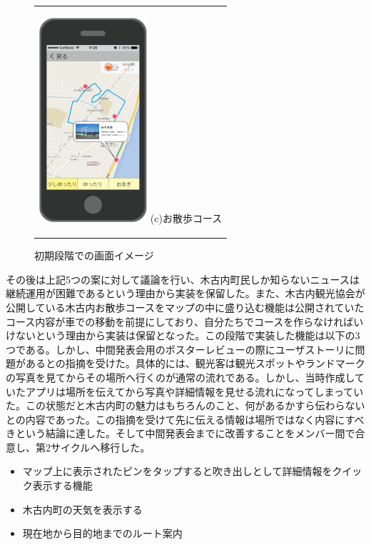 \begin{figure}[htbp]
\begin{center}
\begin{tabular}{c}
      \begin{minipage}{0.33\hsize}
        \begin{center}
\includegraphics[width=4cm, bb=0 0 302 572]{5.2_sanpo.png}
          \hspace{1cm} (c)お散歩コース
        \end{center}
      \end{minipage}

    \end{tabular}
    \caption{初期段階での画面イメージ}
    \label{fig:lena}
  \end{center}
\end{figure}

その後は上記5つの案に対して議論を行い、木古内町民しか知らないニュースは継続運用が困難であるという理由から実装を保留した。また、木古内観光協会が公開している木古内お散歩コースをマップの中に盛り込む機能は公開されていたコース内容が車での移動を前提にしており、自分たちでコースを作らなければいけないという理由から実装は保留となった。この段階で実装した機能は以下の3つである。しかし、中間発表会用のポスターレビューの際にユーザストーリに問題があるとの指摘を受けた。具体的には、観光客は観光スポットやランドマークの写真を見てからその場所へ行くのが通常の流れである。しかし、当時作成していたアプリは場所を伝えてから写真や詳細情報を見せる流れになってしまっていた。この状態だと木古内町の魅力はもちろんのこと、何があるかすら伝わらないとの内容であった。この指摘を受けて先に伝える情報は場所ではなく内容にすべきという結論に達した。そして中間発表会までに改善することをメンバー間で合意し、第2サイクルへ移行した。
\begin{itemize}
 \item マップ上に表示されたピンをタップすると吹き出しとして詳細情報をクイック表示する機能
 \item 木古内町の天気を表示する
 \item 現在地から目的地までのルート案内
\end{itemize}

